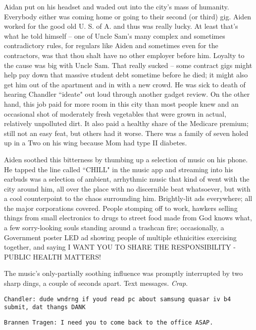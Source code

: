 \documentclass[11pt]{book}
\begin{document}
	Aidan put on his headset and waded out into the city's mass of humanity. Everybody either was coming home or going to their second (or third) gig. Aiden worked for the good old U. S. of A. and thus was really lucky. At least that's what he told himself -- one of Uncle Sam's many complex and sometimes contradictory rules, for regulars like Aiden and sometimes even for the contractors, was that thou shalt have no other employer before him. Loyalty to the cause was big with Uncle Sam. That really sucked -- some contract gigs might help pay down that massive student debt sometime before he died; it might also get him out of the apartment and in with a new crowd. He was sick to death of hearing Chandler ``ideate" out loud through another gadget review. On the other hand, this job paid for more room in this city than most people knew and an occasional shot of moderately fresh vegetables that were grown in actual, relatively unpolluted dirt. It also paid a healthy share of the Medicare premium; still not an easy feat, but others had it worse. There was a family of seven holed up in a Two on his wing because Mom had type II diabetes.
	
	Aiden soothed this bitterness by thumbing up a selection of music on his phone. He tapped the line called ``CHILL" in the music app and streaming into his earbuds was a selection of ambient, arrhythmic music that kind of went with the city around him, all over the place with no discernible beat whatsoever, but with a cool counterpoint to the chaos surrounding him. Brightly-lit ads everywhere; all the major corporations covered. People stomping off to work, hawkers selling things from small electronics to drugs to street food made from God knows what, a few sorry-looking souls standing around a trashcan fire; occasionally, a Government poster LED ad showing people of multiple ethnicities exercising together, and saying I WANT YOU TO SHARE THE RESPONSIBILITY - PUBLIC HEALTH MATTERS! 
	
	The music's only-partially soothing influence was promptly interrupted by two sharp dings, a couple of seconds apart. Text messages. \textit{Crap}.
	
	\vspace{0.5cm}
	
	\texttt{Chandler: dude wndrng if youd read pc about samsung quasar iv b4 submit, dat thangs DANK} 
	
	\texttt{Brannen Tragen: I need you to come back to the office ASAP.}
	
	\vspace{0.5cm}
	
\end{document}
